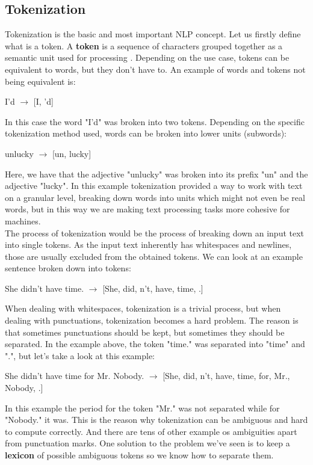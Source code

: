 \documentclass[12pt]{article}
\numberwithin{equation}{section}
\begin{document}
\begin{spacing}{1.5}
	\subsection{Tokenization}
	Tokenization is the basic and most important NLP concept. Let us firstly define what is a token. A \textbf{token} is a sequence of characters grouped together as a semantic unit used for processing \cite{stanford_NLP}. Depending on the use case,  tokens can be equivalent to words, but they don't have to. An example of words and tokens not being equivalent is:
	\begin{center}
		I'd $\rightarrow$ [I, 'd]
	\end{center}
	In this case the word "I'd" was broken into two tokens. Depending on the specific tokenization method used, words can be broken into lower units (subwords):
	\begin{center}
		unlucky $\rightarrow$ [un, lucky]
	\end{center}
	Here, we have that the adjective "unlucky" was broken into its prefix "un" and the adjective "lucky". In this example tokenization provided a way to work with text on a granular level, breaking down words into units which might not even be real words, but in this way we are making text processing tasks more cohesive for machines. \\
	The process of tokenization would be the process of breaking down an input text into single tokens. As the input text inherently has whitespaces and newlines, those are usually excluded from the obtained tokens. We can look at an example sentence broken down into tokens: 
	\begin{center}
		She didn't have time. $\rightarrow$ [She, did, n't, have, time, .]
	\end{center}
	When dealing with whitespaces, tokenization is a trivial process, but when dealing with punctuations, tokenization becomes a hard problem. The reason is that sometimes punctuations should be kept, but sometimes they should be separated. In the example above, the token "time." was separated into "time" and ".", but let's take a look at this example:
	\begin{center}
		She didn't have time for Mr. Nobody. $\rightarrow$ [She, did, n't, have, time, for, Mr., Nobody, .]
	\end{center}
	In this example the period for the token "Mr." was not separated while for "Nobody." it was. This is the reason why tokenization can be ambiguous and hard to compute correctly. And there are tens of other example os ambiguities apart from punctuation marks. One solution to the problem we've seen is to keep a \textbf{lexicon} of possible ambiguous tokens so we know how to separate them.
	

\end{spacing}
\end{document}
